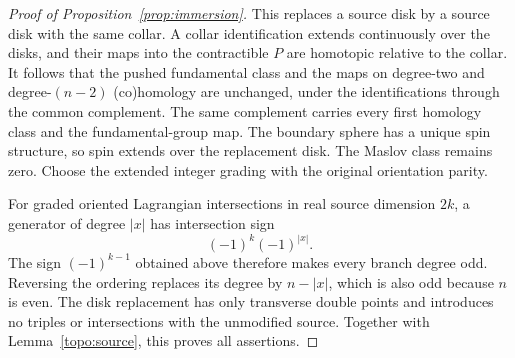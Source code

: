 \begin{proof}[Proof of Proposition~\ref{prop:immersion}]
This replaces a source disk by a source disk with the same
collar.  A collar identification extends continuously over
the disks, and their maps into the contractible $P$ are
homotopic relative to the collar.  It follows that the pushed
fundamental class and the maps on degree-two and degree-$(n-2)$
(co)homology are unchanged, under the identifications through
the common complement.  The same complement carries every
first homology class and the fundamental-group map.
The boundary sphere has a unique spin structure, so spin extends
over the replacement disk.  The Maslov class remains zero.
Choose the extended integer grading with the
original orientation parity.

For graded oriented Lagrangian intersections in real source
dimension $2k$, a generator of degree $|x|$ has intersection
sign
\[
 (-1)^k(-1)^{|x|}.
\]
The sign $(-1)^{k-1}$ obtained above therefore makes every
branch degree odd.  Reversing the ordering replaces its degree
by $n-|x|$, which is also odd because $n$ is even.  The disk
replacement has only transverse double points and introduces
no triples or intersections with the unmodified source.
Together with Lemma~\ref{topo:source}, this proves all assertions.
\end{proof}
